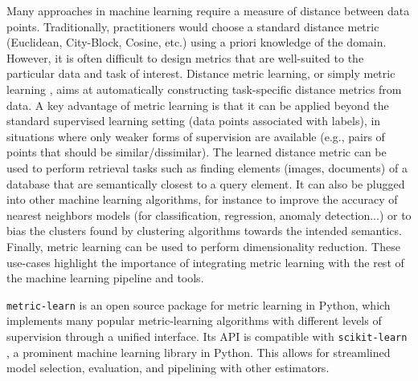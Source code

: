 \documentclass[twoside,11pt]{article}
\begin{document}
Many approaches in machine learning require a measure of distance between data
points. Traditionally, practitioners would choose a standard distance metric
(Euclidean, City-Block, Cosine, etc.) using a priori knowledge of the
domain. However, it is often difficult to design metrics that are well-suited
to the particular data and task of interest.
Distance metric learning, or simply metric learning \citep{Bellet15}, aims at
automatically constructing task-specific distance metrics from data. A key advantage of metric learning is that it can be applied beyond the standard supervised learning setting (data points associated with labels), in situations where only weaker forms of supervision are available (e.g., pairs of points that should be similar/dissimilar). The learned distance metric can be used to perform retrieval tasks such as finding elements (images, documents) of a database that are semantically closest to a query element. It can also be plugged into other machine learning algorithms, for instance to improve the accuracy of nearest neighbors models (for classification, regression, anomaly detection...) or to bias the clusters found by clustering algorithms towards the intended semantics. Finally, metric learning can be used to perform dimensionality reduction.
These use-cases highlight the importance of integrating metric learning with the rest of the machine learning pipeline and tools.

\texttt{metric-learn} is an open source package for metric learning in Python, which implements many popular metric-learning algorithms with different levels of supervision through a unified interface.
Its API is compatible with \texttt{scikit-learn} \citep{scikit-learn}, a prominent machine learning library in Python. This allows for streamlined model selection, evaluation, and pipelining with other estimators.
\end{document}
